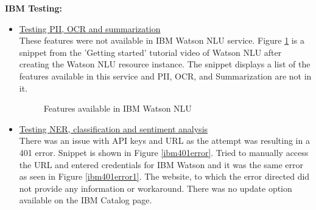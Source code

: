 \textbf{IBM Testing:}
\begin{itemize}
    \item \uline{Testing \acs{PII}, \acs{OCR} and summarization}\\
    These features were not available in IBM Watson \acs{NLU} service. Figure \ref{ibmnotsupported} is a snippet from the 'Getting started' tutorial video of Watson \acs{NLU} \cite{ibmstarter} after creating the Watson \acs{NLU} resource instance. The snippet displays a list of the features available in this service and \acs{PII}, \acs{OCR}, and Summarization are not in it.
    \begin {figure}[h!h]
        \centering
        \caption{Features available in IBM Watson \acs{NLU}}
        \label{ibmnotsupported}
    \end {figure}
    \item \uline{Testing \acs{NER}, classification and sentiment analysis}\\
    There was an issue with API keys and URL as the attempt was resulting in a 401 error. Snippet is shown in Figure \ref{ibm401error}. Tried to manually access the URL and entered credentials for IBM Watson and it was the same error as seen in Figure \ref{ibm401error1}. The website, to which the error directed did not provide any information or workaround. There was no update option available on the IBM Catalog page.
    \begin {figure}[h!h]
        \centering

\end{figure}
\end{itemize}
